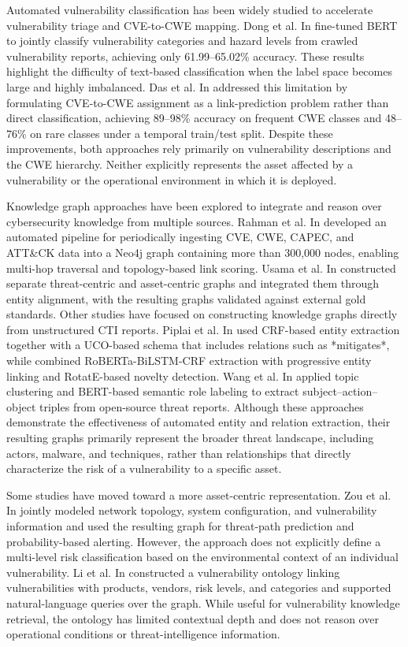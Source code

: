 \documentclass[conference]{IEEEtran}
\begin{document}
Automated vulnerability classification has been widely studied to accelerate vulnerability triage and CVE-to-CWE mapping. Dong et al. In \cite{b3} fine-tuned BERT to jointly classify vulnerability categories and hazard levels from crawled vulnerability reports, achieving only 61.99–65.02\% accuracy. These results highlight the difficulty of text-based classification when the label space becomes large and highly imbalanced. Das et al. In \cite{b8} addressed this limitation by formulating CVE-to-CWE assignment as a link-prediction problem rather than direct classification, achieving 89–98\% accuracy on frequent CWE classes and 48–76\% on rare classes under a temporal train/test split. Despite these improvements, both approaches rely primarily on vulnerability descriptions and the CWE hierarchy. Neither explicitly represents the asset affected by a vulnerability or the operational environment in which it is deployed.

Knowledge graph approaches have been explored to integrate and reason over cybersecurity knowledge from multiple sources. Rahman et al. In \cite{b4} developed an automated pipeline for periodically ingesting CVE, CWE, CAPEC, and ATT\&CK data into a Neo4j graph containing more than 300,000 nodes, enabling multi-hop traversal and topology-based link scoring. Usama et al. In \cite{b9} constructed separate threat-centric and asset-centric graphs and integrated them through entity alignment, with the resulting graphs validated against external gold standards. Other studies have focused on constructing knowledge graphs directly from unstructured CTI reports. Piplai et al. In \cite{b13} used CRF-based entity extraction together with a UCO-based schema that includes relations such as *mitigates*, while \cite{b1} combined RoBERTa-BiLSTM-CRF extraction with progressive entity linking and RotatE-based novelty detection. Wang et al. In \cite{b6} applied topic clustering and BERT-based semantic role labeling to extract subject–action–object triples from open-source threat reports. Although these approaches demonstrate the effectiveness of automated entity and relation extraction, their resulting graphs primarily represent the broader threat landscape, including actors, malware, and techniques, rather than relationships that directly characterize the risk of a vulnerability to a specific asset.

Some studies have moved toward a more asset-centric representation. Zou et al. In \cite{b5} jointly modeled network topology, system configuration, and vulnerability information and used the resulting graph for threat-path prediction and probability-based alerting. However, the approach does not explicitly define a multi-level risk classification based on the environmental context of an individual vulnerability. Li et al. In \cite{b11} constructed a vulnerability ontology linking vulnerabilities with products, vendors, risk levels, and categories and supported natural-language queries over the graph. While useful for vulnerability knowledge retrieval, the ontology has limited contextual depth and does not reason over operational conditions or threat-intelligence information.
\end{document}
